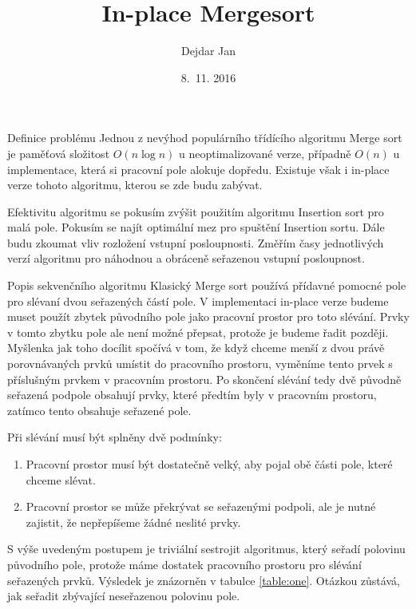 \documentclass[a4paper,11pt]{article}
\title{In-place Mergesort}
\author{Dejdar Jan}
\date{8.~11. 2016}
\begin{document}
\maketitle


\begin{section}{Definice problému}
Jednou z nevýhod populárního třídícího algoritmu Merge sort je paměťová
složitost $O(n\log{n})$ u neoptimalizované verze, případně $O(n)$ u implementace,
která si pracovní pole alokuje dopředu. Existuje však i in-place verze tohoto algoritmu,
kterou se zde budu zabývat. 

Efektivitu algoritmu se pokusím zvýšit použitím algoritmu Insertion sort pro malá pole.
Pokusím se najít optimální mez pro spuštění Insertion sortu. Dále budu zkoumat vliv rozložení 
vstupní posloupnosti. Změřím časy jednotlivých verzí  algoritmu pro náhodnou a obráceně seřazenou 
vstupní posloupnost.

\begin{subsection}{Popis sekvenčního algoritmu}
Klasický Merge sort používá přídavné pomocné pole pro slévaní dvou seřazených částí pole.
V implementaci in-place verze budeme muset použít zbytek původního pole jako pracovní prostor
pro toto slévání. Prvky v tomto zbytku pole ale není možné přepsat, protože je budeme řadit později.
Myšlenka jak toho docílit spočívá v tom, že když chceme menší z dvou právě porovnávaných prvků
umístit do pracovního prostoru, vyměníme tento prvek s příslušným prvkem v pracovním prostoru.
Po skončení slévání tedy dvě původně seřazená podpole obsahují prvky, které předtím byly v
pracovním prostoru, zatímco tento obsahuje seřazené pole.

Při slévání musí být splněny dvě podmínky:
\begin{enumerate}
	\item Pracovní prostor musí být dostatečně velký, aby pojal obě části pole, které chceme slévat.
	\item Pracovní prostor se může překrývat se seřazenými podpoli, ale je nutné zajistit, že nepřepíšeme
		žádné neslité prvky.
\end{enumerate}
\pagebreak

S výše uvedeným postupem je triviální sestrojit algoritmus, který seřadí polovinu původního pole, 
protože máme dostatek pracovního prostoru pro slévání seřazených prvků. Výsledek je znázorněn v tabulce \ref{table:one}.
Otázkou zůstává, jak seřadit zbývající neseřazenou polovinu pole.



\end{subsection}
\end{section}
\end{document}
